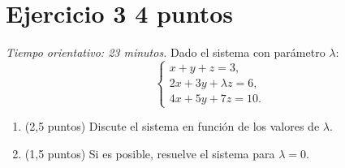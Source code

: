 \documentclass[12pt]{article}
\begin{document}
\section*{Ejercicio 3 \hfill 4 puntos}
\textit{Tiempo orientativo: 23 minutos.} Dado el sistema con parámetro $\lambda$:
\[
\begin{cases}x+y+z=3,\\2x+3y+\lambda z=6,\\4x+5y+7z=10.\end{cases}
\]
\begin{enumerate}[label=(\alph*)]
\item (2,5 puntos) Discute el sistema en función de los valores de $\lambda$.
\item (1,5 puntos) Si es posible, resuelve el sistema para $\lambda=0$.
\end{enumerate}
\end{document}
